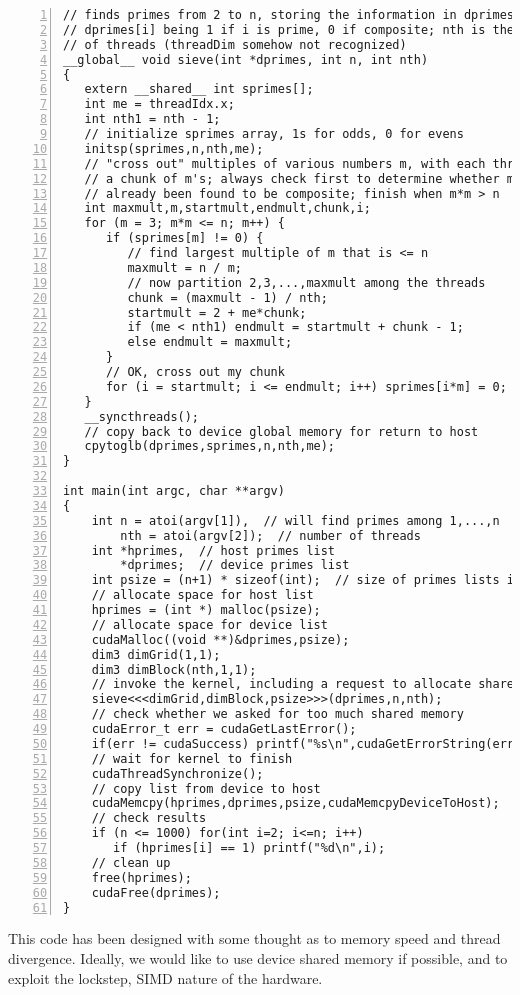 \begin{lstlisting}[numbers=left]
// finds primes from 2 to n, storing the information in dprimes, with
// dprimes[i] being 1 if i is prime, 0 if composite; nth is the number
// of threads (threadDim somehow not recognized)
__global__ void sieve(int *dprimes, int n, int nth)
{
   extern __shared__ int sprimes[];
   int me = threadIdx.x;  
   int nth1 = nth - 1;
   // initialize sprimes array, 1s for odds, 0 for evens
   initsp(sprimes,n,nth,me);
   // "cross out" multiples of various numbers m, with each thread doing
   // a chunk of m's; always check first to determine whether m has
   // already been found to be composite; finish when m*m > n
   int maxmult,m,startmult,endmult,chunk,i;
   for (m = 3; m*m <= n; m++) {
      if (sprimes[m] != 0) {
         // find largest multiple of m that is <= n
         maxmult = n / m;
         // now partition 2,3,...,maxmult among the threads
         chunk = (maxmult - 1) / nth;
         startmult = 2 + me*chunk;
         if (me < nth1) endmult = startmult + chunk - 1;
         else endmult = maxmult;
      }
      // OK, cross out my chunk
      for (i = startmult; i <= endmult; i++) sprimes[i*m] = 0;
   }
   __syncthreads();
   // copy back to device global memory for return to host
   cpytoglb(dprimes,sprimes,n,nth,me);
}

int main(int argc, char **argv)
{
    int n = atoi(argv[1]),  // will find primes among 1,...,n
        nth = atoi(argv[2]);  // number of threads
    int *hprimes,  // host primes list
        *dprimes;  // device primes list
    int psize = (n+1) * sizeof(int);  // size of primes lists in bytes
    // allocate space for host list
    hprimes = (int *) malloc(psize);  
    // allocate space for device list 
    cudaMalloc((void **)&dprimes,psize);
    dim3 dimGrid(1,1);
    dim3 dimBlock(nth,1,1);
    // invoke the kernel, including a request to allocate shared memory
    sieve<<<dimGrid,dimBlock,psize>>>(dprimes,n,nth);
    // check whether we asked for too much shared memory
    cudaError_t err = cudaGetLastError();
    if(err != cudaSuccess) printf("%s\n",cudaGetErrorString(err));
    // wait for kernel to finish
    cudaThreadSynchronize();
    // copy list from device to host
    cudaMemcpy(hprimes,dprimes,psize,cudaMemcpyDeviceToHost);
    // check results
    if (n <= 1000) for(int i=2; i<=n; i++) 
       if (hprimes[i] == 1) printf("%d\n",i);
    // clean up
    free(hprimes);
    cudaFree(dprimes);
}
\end{lstlisting}

This code has been designed with some thought as to memory speed and
thread divergence.  Ideally, we would like to use device shared memory
if possible, and to exploit the lockstep, SIMD nature of the hardware.

